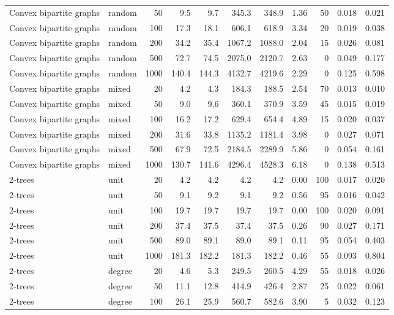 \begin{tabular}{llrrrrrrrrr}
Convex bipartite graphs & random & 50 & 9.5 & 9.7 & 345.3 & 348.9 & 1.36 & 50 & 0.018 & 0.021 \\
Convex bipartite graphs & random & 100 & 17.3 & 18.1 & 606.1 & 618.9 & 3.34 & 20 & 0.019 & 0.038 \\
Convex bipartite graphs & random & 200 & 34.2 & 35.4 & 1067.2 & 1088.0 & 2.04 & 15 & 0.026 & 0.081 \\
Convex bipartite graphs & random & 500 & 72.7 & 74.5 & 2075.0 & 2120.7 & 2.63 & 0 & 0.049 & 0.177 \\
Convex bipartite graphs & random & 1000 & 140.4 & 144.3 & 4132.7 & 4219.6 & 2.29 & 0 & 0.125 & 0.598 \\
Convex bipartite graphs & mixed & 20 & 4.2 & 4.3 & 184.3 & 188.5 & 2.54 & 70 & 0.013 & 0.010 \\
Convex bipartite graphs & mixed & 50 & 9.0 & 9.6 & 360.1 & 370.9 & 3.59 & 45 & 0.015 & 0.019 \\
Convex bipartite graphs & mixed & 100 & 16.2 & 17.2 & 629.4 & 654.4 & 4.89 & 15 & 0.020 & 0.037 \\
Convex bipartite graphs & mixed & 200 & 31.6 & 33.8 & 1135.2 & 1181.4 & 3.98 & 0 & 0.027 & 0.071 \\
Convex bipartite graphs & mixed & 500 & 67.9 & 72.5 & 2184.5 & 2289.9 & 5.86 & 0 & 0.054 & 0.161 \\
Convex bipartite graphs & mixed & 1000 & 130.7 & 141.6 & 4296.4 & 4528.3 & 6.18 & 0 & 0.138 & 0.513 \\
2-trees & unit & 20 & 4.2 & 4.2 & 4.2 & 4.2 & 0.00 & 100 & 0.017 & 0.020 \\
2-trees & unit & 50 & 9.1 & 9.2 & 9.1 & 9.2 & 0.56 & 95 & 0.016 & 0.042 \\
2-trees & unit & 100 & 19.7 & 19.7 & 19.7 & 19.7 & 0.00 & 100 & 0.020 & 0.091 \\
2-trees & unit & 200 & 37.4 & 37.5 & 37.4 & 37.5 & 0.26 & 90 & 0.027 & 0.171 \\
2-trees & unit & 500 & 89.0 & 89.1 & 89.0 & 89.1 & 0.11 & 95 & 0.054 & 0.403 \\
2-trees & unit & 1000 & 181.3 & 182.2 & 181.3 & 182.2 & 0.46 & 55 & 0.093 & 0.804 \\
2-trees & degree & 20 & 4.6 & 5.3 & 249.5 & 260.5 & 4.29 & 55 & 0.018 & 0.026 \\
2-trees & degree & 50 & 11.1 & 12.8 & 414.9 & 426.4 & 2.87 & 25 & 0.022 & 0.061 \\
2-trees & degree & 100 & 26.1 & 25.9 & 560.7 & 582.6 & 3.90 & 5 & 0.032 & 0.123 \\

\end{tabular}
